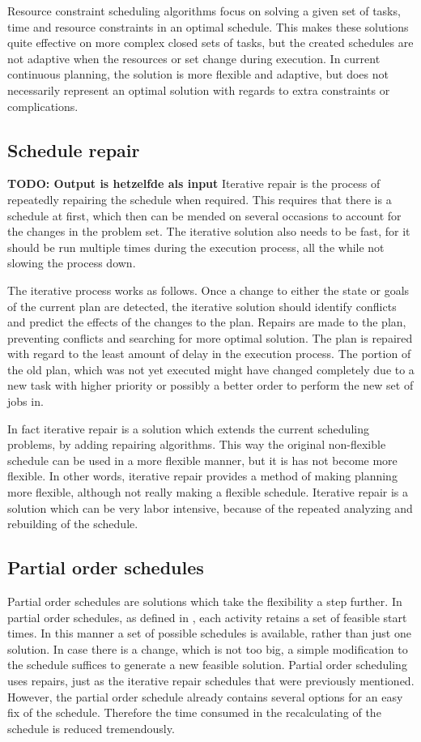 \documentclass{article}
\newcommand{\TODO}[1]{{\color{red}\textbf{TODO: #1}}}
\begin{document}
Resource constraint scheduling algorithms focus on solving a given set of tasks, time and resource constraints in an optimal schedule.
This makes these solutions quite effective on more complex closed sets of tasks, but the created schedules are not adaptive when the resources or set change during execution.
In current continuous planning, the solution is more flexible and adaptive, but does not necessarily represent an optimal solution with regards to extra constraints or complications.
\cite{laborie03}
\subsection{Schedule repair}
\TODO{Output is hetzelfde als input}
Iterative repair is the process of repeatedly repairing the schedule when required.
This requires that there is a schedule at first, which then can be mended on several occasions to account for the changes in the problem set.
The iterative solution also needs to be fast, for it should be run multiple times during the execution process, all the while not slowing the process down.

The iterative process works as follows.
Once a change to either the state or goals of the current plan are detected, the iterative solution should identify conflicts and predict the effects of the changes to the plan.
Repairs are made to the plan, preventing conflicts and searching for more optimal solution.
The plan is repaired with regard to the least amount of delay in the execution process.
The portion of the old plan, which was not yet executed might have changed completely due to a new task with higher priority or possibly a better order to perform the new set of jobs in.
\cite{chien00}

In fact iterative repair is a solution which extends the current scheduling problems, by adding repairing algorithms.
This way the original non-flexible schedule can be used in a more flexible manner, but it is has not become more flexible.
In other words, iterative repair provides a method of making planning more flexible, although not really making a flexible schedule.
Iterative repair is a solution which can be very labor intensive, because of the repeated analyzing and rebuilding of the schedule.

\subsection{Partial order schedules}
Partial order schedules are solutions which take the flexibility a step further.
In partial order schedules, as defined in \cite{policella07}, each activity retains a set of feasible start times.
In this manner a set of possible schedules is available, rather than just one solution.
In case there is a change, which is not too big, a simple modification to the schedule suffices to generate a new feasible solution.
Partial order scheduling uses repairs, just as the iterative repair schedules that were previously mentioned.
However, the partial order schedule already contains several options for an easy fix of the schedule.
Therefore the time consumed in the recalculating of the schedule is reduced tremendously.
\end{document}
